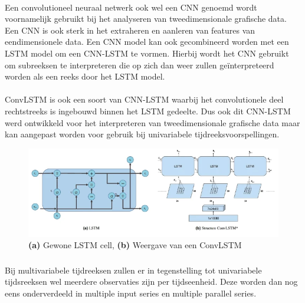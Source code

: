\paragraph{}

Een convolutioneel neuraal netwerk ook wel een CNN genoemd wordt voornamelijk gebruikt bij het analyseren van tweedimensionale grafische data. Een CNN is ook sterk in het extraheren en aanleren van features van eendimensionele data. Een CNN model kan ook gecombineerd worden met een LSTM model om een CNN-LSTM te vormen. Hierbij wordt het CNN gebruikt om subreeksen te interpreteren die op zich dan weer zullen ge\"{i}nterpreteerd worden als een reeks door het LSTM model. 

\paragraph{}

ConvLSTM is ook een soort van CNN-LSTM waarbij het convolutionele deel rechtstreeks is ingebouwd binnen het LSTM gedeelte. Dus ook dit CNN-LSTM werd ontwikkeld voor het interpreteren van tweedimensionale grafische data maar kan aangepast worden voor gebruik bij univariabele tijdreeksvoorspellingen.

\begin{figure}
    \centering
    \caption{\textbf{(a)} Gewone LSTM cell, \textbf{(b)} Weergave van een ConvLSTM~\autocite{Rahman2019}}
    \label{fig:ConvLSTM}
    \includegraphics[width=0.7\linewidth]{ConvLSTM}
\end{figure}


\subsubsection{}

Bij multivariabele tijdreeksen zullen er in tegenstelling tot univariabele tijdsreeksen wel meerdere observaties zijn per tijdseenheid. Deze worden dan nog eens onderverdeeld in multiple input series en multiple parallel series. 

